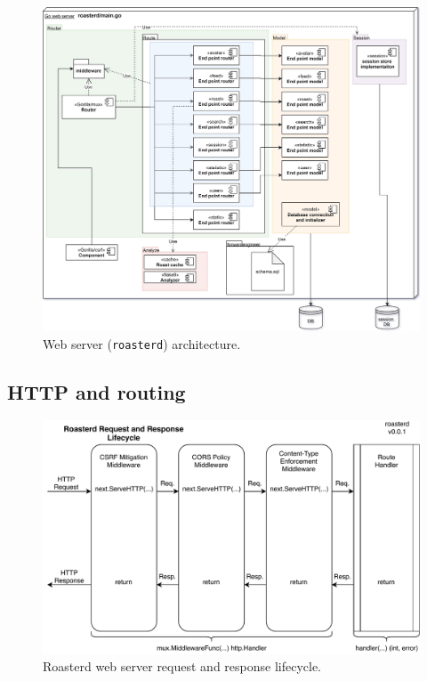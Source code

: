\documentclass[12pt,a4paper]{report}
\begin{document}
\begin{figure}[H]
  \centering
  \includegraphics[width=17cm]{server-architecture.png}
  \caption{Web server (\texttt{roasterd}) architecture.}
\end{figure}

\subsection{HTTP and routing}
\begin{figure}[H]
  \centering
  \includegraphics[width=16cm]{roasterd-req-resp-lifecycle-v0_0_1.pdf}
  \caption{Roasterd web server request and response lifecycle.}
  \label{fig:roasterd-lifecycle}
\end{figure}
\end{document}
